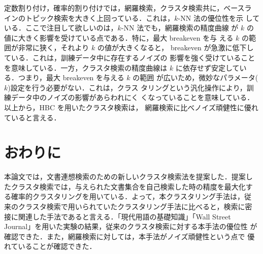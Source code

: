 定数割り付け，確率的割り付けでは，網羅検索，クラスタ検索共に，ベースラ
インのトピック検索を大きく上回っている．これは，$k$-NN 法の優位性を示
している．ここで注目して欲しいのは，$k$-NN 法でも，網羅検索の精度曲線
が $k$ の値に大きく影響を受けている点である．特に，最大 breakeven を与
える $k$ の範囲が非常に狭く，それより $k$ の値が大きくなると，
breakeven が急激に低下している．これは，訓練データ中に存在するノイズの
影響を強く受けていることを意味している．一方，クラスタ検索の精度曲線は 
$k$ に依存せず安定している．つまり，最大 breakeven を与える $k$ の範囲
が広いため，微妙なパラメータ($k$)設定を行う必要がない．これは，クラス
タリングという汎化操作により，訓練データ中のノイズの影響があらわれにく
くなっていることを意味している．以上から，HBC を用いたクラスタ検索は，
網羅検索に比べノイズ頑健性に優れていると言える．

\section{おわりに}

本論文では，文書連想検索のための新しいクラスタ検索法を提案した．提案し
たクラスタ検索では，与えられた文書集合を自己検索した時の精度を最大化す
る確率的クラスタリングを用いている．よって，本クラスタリング手法は，従
来のクラスタ検索で用いられていたクラスタリング手法に比べると，検索に密
接に関連した手法であると言える．「現代用語の基礎知識」「Wall Street
Journal」を用いた実験の結果，従来のクラスタ検索に対する本手法の優位性
が確認できた．また，網羅検索に対しては，本手法がノイズ頑健性という点で
優れていることが確認できた．

